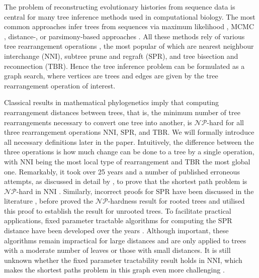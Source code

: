 \documentclass[11pt]{amsart}
\newcommand{\nni}{\mathrm{NNI}}
\newcommand{\spr}{\mathrm{SPR}}
\newcommand{\tbr}{\mathrm{TBR}}
\newcommand{\np}{\mathcal{NP}}
\newcommand{\summary}[1]{} %
\begin{document}
\summary{Motivation: many popular tree search algorithms are based on NNI (e.g. this \url{https://academic.oup.com/mbe/article/28/10/2731/973375} tool has been cited 40K+ times, see also references there to PhyML, RaxML, etc. -- they all use NNI); other applications include tree comparison methods, tree inference methods (proposal distributions), summary statistics, etc.}
The problem of reconstructing evolutionary histories from sequence data is central for many tree inference methods used in computational biology.
The most common approaches infer trees from sequences via maximum likelihood \autocite{Stamatakis2006-xb, Guindon2010-lo}, MCMC \autocite{Ronquist2003-eq, Suchard2018-tw, Bouckaert2019-yr}, distance-, or parsimony-based approaches \autocite{Tamura2011-ky}.
All these methods rely of various tree rearrangement operations \autocite{Semple2003-nj}, the most popular of which are nearest neighbour interchange ($\nni$), subtree prune and regraft ($\spr$), and tree bisection and reconnection ($\tbr$).
Hence the tree inference problem can be formulated as a graph search, where vertices are trees and edges are given by the tree rearrangement operation of interest.

\summary{Motivation: However, all known graph-based tree rearrangement distances, including NNI, are NP-hard, and it took many years and paper to prove that; so approach such as practical FPT algorithms is an active area of research to overcome the computational (cite Whidden).}
Classical results in mathematical phylogenetics imply that computing rearrangement distances between trees, that is, the minimum number of tree rearrangements necessary to convert one tree into another, is $\np$-hard \autocite{Dasgupta2000-xa, Bordewich2005-nx, Hickey2008-wv, Allen2001-ky} for all three rearrangement operations $\nni$, $\spr$, and $\tbr$.
We will formally introduce all necessary definitions later in the paper.
Intuitively, the difference between the three operations is how much change can be done to a tree by a single operation, with $\nni$ being the most local type of rearrangement and $\tbr$ the most global one.
Remarkably, it took over 25 years and a number of published erroneous attempts, as discussed in detail by \textcite{Dasgupta2000-xa}, to prove that the shortest path problem is $\np$-hard in $\nni$ \autocite{Dasgupta2000-xa}.
Similarly, incorrect proofs for $\spr$ have been discussed in the literature \autocite{Hein1996-em, Allen2001-ky}, before \textcite{Bordewich2005-nx} proved the $\np$-hardness result for rooted trees and \textcite{Hickey2008-wv} utilised this proof to establish the result for unrooted trees.
To facilitate practical applications, fixed parameter tractable algorithms for computing the $\spr$ distance have been developed over the years \autocite{Whidden2010-bw, Bordewich2005-nx, Whidden2018-fw}.
Although important, these algorithms remain impractical for large distances and are only applied to trees with a moderate number of leaves or those with small distances.
It is still unknown whether the fixed parameter tractability result holds in $\nni$, which makes the shortest paths problem in this graph even more challenging \autocite{Gavryushkin2018-ol}.
\end{document}
